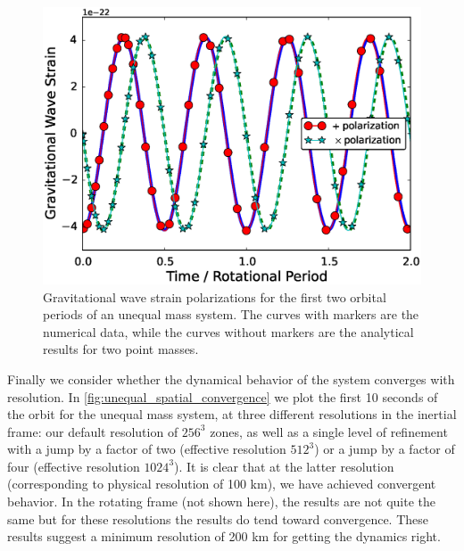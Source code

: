 \documentclass[iop,numberedappendix]{../emulateapj}
\begin{document}
\begin{figure}
  \centering
  \includegraphics[scale=0.45]{plots/unequal_gw_rot0.eps}
  \caption{Gravitational wave strain polarizations for the first two orbital periods of an 
           unequal mass system. The curves with markers are the numerical data, while the 
           curves without markers are the analytical results for two point masses.\label{fig:gw_strain}}
\end{figure}

Finally we consider whether the dynamical behavior of the system converges with resolution. 
In \autoref{fig:unequal_spatial_convergence} we plot the first 10 seconds of the orbit for 
the unequal mass system, at three different resolutions in the inertial frame: our default 
resolution of $256^3$ zones, as well as a single level of refinement with a jump by a factor of 
two (effective resolution $512^3$) or a jump by a factor of four (effective resolution $1024^3$). 
It is clear that at the latter resolution (corresponding to physical resolution of 100 km), 
we have achieved convergent behavior. In the rotating frame (not shown here), the results are 
not quite the same but for these resolutions the results do tend toward convergence. These 
results suggest a minimum resolution of 200 km for getting the dynamics right.
\end{document}
